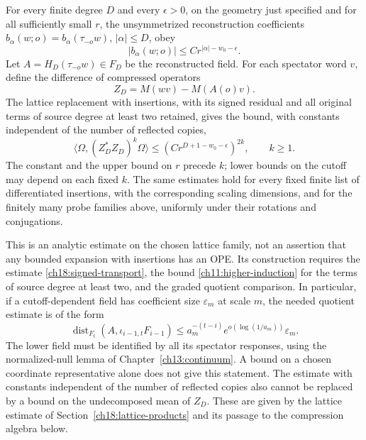\begin{proposition}
\label{ch18:replacement-input}
For every finite degree $D$ and every $\epsilon>0$, on the geometry
just specified and for all sufficiently small $r$, the unsymmetrized reconstruction
coefficients $b_\alpha(w;o)=b_\alpha(\tau_{-o}w)$, $|\alpha|\le D$, obey
\[
 |b_\alpha(w;o)|\le C r^{|\alpha|-w_0-\epsilon}.
\]
Let $A=H_D(\tau_{-o}w)\in F_D$ be the reconstructed field. For
each spectator word $v$, define the difference of compressed operators
\[
 Z_D=M(wv)-M(A(o)v).
\]
The lattice replacement with insertions, with its signed residual and
all original terms of source degree at least two retained, gives the bound, with constants independent of the number of reflected copies,
\begin{equation}
 \langle\Omega,(Z_D^*Z_D)^k\Omega\rangle
       \le (C r^{D+1-w_0-\epsilon})^{2k},\qquad k\ge1.
 \label{ch18:replacement-moments}
\end{equation}
The constant and the upper bound on $r$ precede $k$; lower bounds on the cutoff
may depend on each fixed $k$. The same estimates hold for every fixed
finite list of differentiated insertions, with the corresponding
scaling dimensions, and for the finitely many probe families above,
uniformly under their rotations and conjugations.
\end{proposition}

This is an analytic estimate on the chosen lattice family, not an assertion
that any bounded expansion with insertions has an OPE. Its construction requires
the estimate \eqref{ch18:signed-transport}, the bound \eqref{ch11:higher-induction} for the terms of source degree at least two,
and the graded quotient comparison. In particular, if a cutoff-dependent field
has coefficient size $\varepsilon_m$ at scale $m$, the needed quotient
estimate is of the form
\[
 \operatorname{dist}_{F_t}(A,\iota_{i-1,t}F_{i-1})
       \le a_m^{-(t-i)}e^{o(\log(1/a_m))}\varepsilon_m .
\]
The lower field must be identified by all its spectator responses, using the
normalized-null lemma of Chapter~\ref{ch13:continuum}. A bound on a chosen
coordinate representative alone does not give this statement.
The estimate with constants independent of the number of reflected copies also cannot be replaced by a bound on the undecomposed
mean of $Z_D$. These are given by the lattice estimate of Section~\ref{ch18:lattice-products} and its passage to the compression algebra below.

